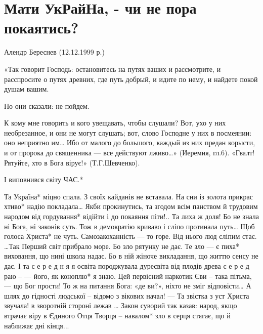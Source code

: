 
 
 
 
 

\section{Мати УкРайНа, - чи не пора покаятись?}
\label{sec:proza.rus.beresnev_alendr.1.ukrajna_pokajatys}

Алендр Береснев
(12.12.1999 р.)

«Так говорит Господь:  остановитесь на путях ваших и рассмотрите, и расспросите
о путях древних, где путь добрый, и идите по нему, и найдете покой душам вашим.

Но они сказали:  не пойдем.

К кому мне говорить и кого увещавать, чтобы слушали? Вот, ухо у них
необрезанное, и они не могут слушать;       вот, слово Господне у них в посмеянии:
оно неприятно им…   Ибо от малого до большого, каждый из них предан корысти,
и от пророка до священника --- все действуют лживо…»  (Иеремия, гл.6).
«Гвалт! Рятуйте, хто в Бога вірує!»  (Т.Г.Шевченко).

І виповнився світу  ЧАС.*

Та Україна* міцно спала.
З своїх кайданів не вставала.
На сни із золота прикрас
хтиво* надію покладала…
     Якби прокинутись, та згодом
     всім панством й трудовим народом
     від гордування* відійти
     і до покаяння піти!..
Та лиха ж доля!   Бо не знала
ні  Бога,  ні законів суть.
Тож в демократію криваво
і сліпо протинала путь…
Щоб голоса Христа* не чуть.
     Самозакоханність --- то горе.
     Від нього люд сліпим стає.
     …Так Перший світ прибрало море.
     Бо зло рятунку не дає.
Те зло --- є пиха* виховання,
що нині школа надає.
Бо в ній жіноче викладання,
що життю сенсу не дає.
     І та  с е р е д н я я  освіта
     породжувала дуресвіта
     від плодів древа  с е р е д  раю –
     --- його, як коноплю* я знаю.
Цей первісний наркотик Єви --
така пітьма, --- що Бог прости!
То ж на питання Бога: «де ви?»,
ніхто не зміг відповісти…
     А шлях до гідності людської –
     відомо з вікових начал!
     --- Та  звістка з уст Христа звучала!
     в зворотній стороні лежав …
              Закон суворий так казав:
              народ, якщо втрачає віру
              в Єдиного Отця  Творця –
              навалом* зло в серця стягає,
              що й наближає дні кінця...

